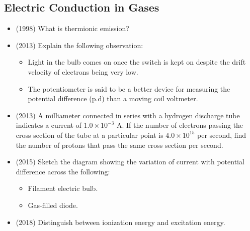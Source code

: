 \documentclass{article}
\begin{document}
\subsection{Electric Conduction in Gases}
\begin{itemize}
\item (1998)  What is thermionic emission?
\item (2013)  Explain the following observation:
 \begin{itemize}
\item Light in the bulb comes on once the switch is kept on despite the drift velocity of electrons being very low.
\item The potentiometer is said to be a better device for measuring the potential difference (p.d) than a moving coil voltmeter.
\end{itemize}
\item (2013)  A milliameter connected in series with a hydrogen discharge tube indicates a current of $ 1.0 \times 10^{-3}$ A. If the number of electrons passing the cross section of the tube at a particular point is $ 4.0 \times 10^{15}$ per second, find the number of protons that pass the same cross section per second. 
\item (2015)  Sketch the diagram showing the variation of current with potential difference across the following:
 \begin{itemize}
\item  Filament electric bulb. 
\item Gas-filled diode. 
\end{itemize}
\item (2018)  Distinguish between ionization energy and excitation energy.
\end{itemize}
\end{document}
